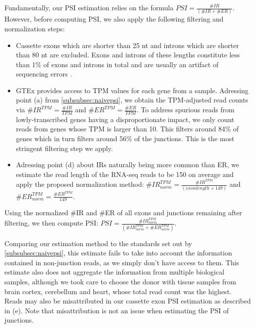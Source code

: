 Fundamentally, our PSI estimation relies on the formula $PSI = \frac{\#IR}{(\#IR+\#ER)}$. However, before computing PSI, we also apply the following filtering and normalization steps:
\begin{itemize}
	\item Cassette exons which are shorter than 25 nt and introns which are shorter than 80 nt are excluded. Exons and introns of these lengths constitute less than 1\% of exons and introns in total and are usually an artifact of sequencing errors \cite{dsc} \cite{shortintrons}.
	\item GTEx provides access to TPM values for each gene from a sample. Adressing point (a) from \ref{subsubsec:naivepsi}, we obtain the TPM-adjusted read counts via $\#IR^{TPM} = \frac{\#IR}{TPM}$ and $\#ER^{TPM} = \frac{\#ER}{TPM}$. To address spurious reads from lowly-transcribed genes having a disproportionate impact, we only count reads from genes whose TPM is larger than 10. This filters around 84\% of genes which in turn filters around 56\% of the junctions. This is the most stringent filtering step we apply. 
	
	\item Adressing point (d) about IRs naturally being more common than ER, we estimate the read length of the RNA-seq reads to be 150 on average \cite{gtex_read_length} and apply the proposed normalization method: $\#IR^{TPM}_{norm} = \frac{\#IR^{TPM}}{(exon length + 149)}$ and $\#ER^{TPM}_{norm} = \frac{\#ER^{TPM}}{149}$.
\end{itemize}

Using the normalized \#IR and \#ER of all exons and junctions remaining after filtering, we then compute PSI: $PSI = \frac{\#IR^{TPM}_{norm}}{(\#IR^{TPM}_{norm}+\#ER^{TPM}_{norm})}$. 

Comparing our estimation method to the standards set out by \ref{subsubsec:naivepsi}, this estimate fails to take into account the information contained in non-junction reads, as we simply don't have access to them.
This estimate also does not aggregate the information from multiple biological samples, although we took care to choose the donor with tissue samples from brain cortex, cerebellum and heart, whose total read count was the highest. 
Reads may also be misattributed in our cassette exon PSI estimation as described in (e). Note that misattribution is not an issue when estimating the PSI of junctions.

